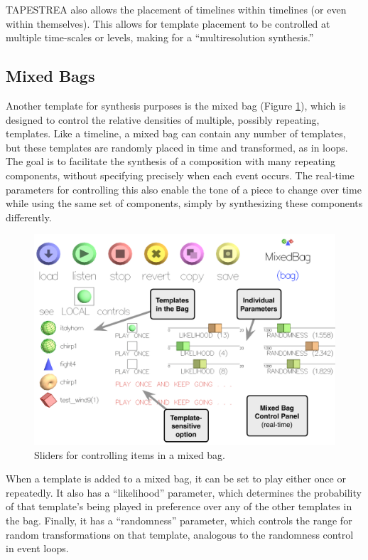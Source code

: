 \documentclass[10pt,letterpaper]{article}
\begin{document}
TAPESTREA also allows the placement of timelines within timelines (or
even within themselves). This allows for template placement to be
controlled at multiple time-scales or levels, making for a
``multiresolution synthesis.''

\subsection{Mixed Bags}

Another template for synthesis purposes is the mixed bag (Figure \ref{fig:ui_mixedbag_params}), which is
designed to control the relative densities of multiple, possibly
repeating, templates. Like a timeline, a mixed bag can contain any
number of templates, but these templates are randomly placed in time and
transformed, as in loops. The goal is to facilitate the synthesis of a
composition with many repeating components, without specifying precisely
when each event occurs. The real-time parameters for controlling this
also enable the tone of a piece to change over time while using the same
set of components, simply by synthesizing these components differently. 

\begin{figure}[h]
  \begin{center}
    \includegraphics[width=.95\columnwidth]{ui_mixedbag.pdf}
    \caption{Sliders for controlling items in a mixed bag.} 
    \label{fig:ui_mixedbag_params}
  \end{center}
\end{figure}

When a template is added to a mixed bag, it can be set to play either
once or repeatedly. It also has a ``likelihood'' parameter, which
determines the probability of that template's being played in preference
over any of the other templates in the bag. Finally, it has a
``randomness'' parameter, which controls the range for random
transformations on that template, analogous to the randomness control in
event loops.
\end{document}
